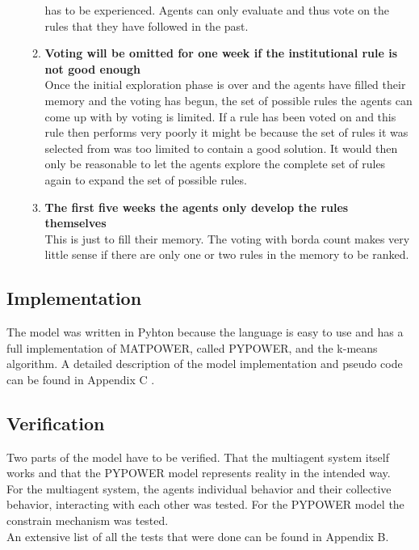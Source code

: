 \documentclass[a4paper]{article}
\begin{document}
\begin{enumerate}
\begin{enumerate}
                                         has to be experienced. Agents can only evaluate and thus vote on  the rules that 
                                         they have followed in the past. 
                                         \item \textbf{Voting will be omitted for one week if the institutional rule 
                                         is not good enough} \\
                                         Once the initial exploration phase is over and the agents have filled their memory 
                                         and the voting has begun, the set of possible rules the agents can come up with by 
                                         voting is limited.  If a rule has been voted on and this rule then performs very 
                                         poorly it might be because the set of rules it was selected from was too limited 
                                         to contain a good solution. It would then only be reasonable to let the agents 
                                         explore the complete set of rules again to expand the set of possible rules. 
                                         \item \textbf{The first five weeks the agents only develop the rules themselves }\\
                                         This is just  to fill their memory. The voting with borda count makes very little
                                         sense if there are only one or two rules in the memory to be ranked.




                                        \end{enumerate}


\end{enumerate}


\subsection{Implementation}
The model was written in Pyhton because the language is easy to use and has a full implementation of MATPOWER, called
PYPOWER, and the k-means algorithm. A detailed description of the model implementation and pseudo 
code can be found in Appendix C . 
\subsection{Verification}
Two parts of the model have to be verified. That the multiagent system itself works and that the PYPOWER model 
represents reality in the intended way.\\
For the multiagent system, the agents individual behavior and their collective behavior, interacting with each other was 
tested. For the PYPOWER model the constrain mechanism was tested.\\
An extensive list of all the tests that were done can be found in Appendix B. 
\end{document}
